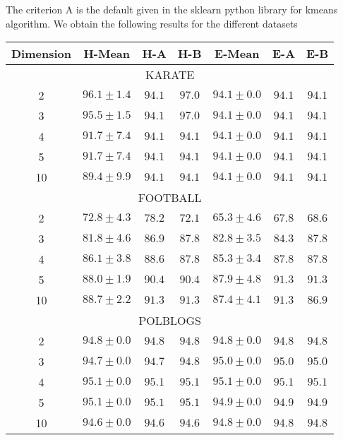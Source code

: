 \documentclass{article}
\begin{document}
The criterion A is the default given in the sklearn python library for kmeans algorithm.  We obtain the following results for the different datasets
\begin{table} 
    \centering 
    \begin{tabular}{|c|ccc|ccc|}
      \hline Dimension & H-Mean & H-A & H-B &  E-Mean & E-A & E-B \\ \hline
      \hline
      \multicolumn{7}{|c|}{KARATE} \\
        \hline
        2& $96.1 \pm 1.4$ & $94.1$ & $97.0$& $94.1 \pm 0.0$&$94.1$ & $94.1$\\ \hline
        3& $95.5 \pm 1.5$ & $94.1$ & $97.0$& $94.1 \pm 0.0$&$94.1$ & $94.1$\\ \hline
        4& $91.7 \pm 7.4$ & $94.1$ & $94.1$& $94.1 \pm 0.0$&$94.1$ & $94.1$\\ \hline
        5& $91.7 \pm 7.4$ & $94.1$ & $94.1$& $94.1 \pm 0.0$&$94.1$ & $94.1$\\ \hline
        10& $89.4 \pm 9.9$ & $94.1$ & $94.1$& $94.1 \pm 0.0$&$94.1$ & $94.1$\\ \hline
      \hline
      \multicolumn{7}{|c|}{FOOTBALL} \\
      \hline
      2& $72.8 \pm 4.3$ & $78.2$ & $72.1$& $65.3 \pm 4.6$&$67.8$ & $68.6$\\ \hline
      3& $81.8 \pm 4.6$ & $86.9$ & $87.8$& $82.8 \pm 3.5$&$84.3$ & $87.8$\\ \hline
      4& $86.1 \pm 3.8$ & $88.6$ & $87.8$& $85.3 \pm 3.4$&$87.8$ & $87.8$\\ \hline
      5& $88.0 \pm 1.9$ & $90.4$ & $90.4$& $87.9 \pm 4.8$&$91.3$ & $91.3$\\ \hline
      10& $88.7 \pm 2.2$ & $91.3$ & $91.3$& $87.4 \pm 4.1$&$91.3$ & $86.9$\\ \hline
      \hline
      \multicolumn{7}{|c|}{POLBLOGS} \\
      \hline
      2& $94.8 \pm 0.0$ & $94.8$ & $94.8$& $94.8 \pm 0.0$&$94.8$ & $94.8$\\ \hline
      3& $94.7 \pm 0.0$ & $94.7$ & $94.8$& $95.0 \pm 0.0$&$95.0$ & $95.0$\\ \hline
      4& $95.1 \pm 0.0$ & $95.1$ & $95.1$& $95.1 \pm 0.0$&$95.1$ & $95.1$\\ \hline
      5& $95.1 \pm 0.0$ & $95.1$ & $95.1$& $94.9 \pm 0.0$&$94.9$ & $94.9$\\ \hline
      10& $94.6 \pm 0.0$ & $94.6$ & $94.6$& $94.8 \pm 0.0$&$94.8$ & $94.8$\\ \hline
  \end{tabular}
\end{table}
\end{document}
